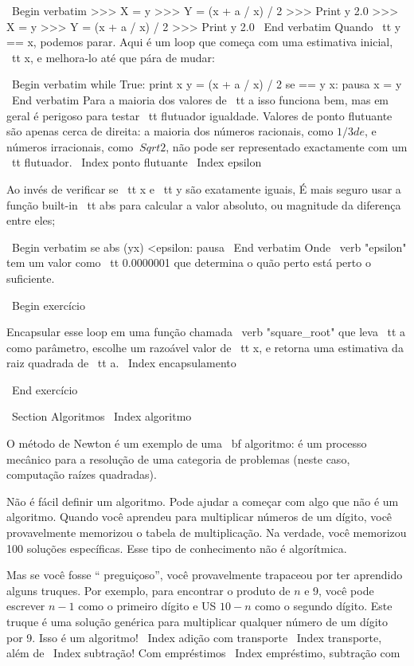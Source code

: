 \documentclass[10pt]{book}
\begin{document}
\begin {itemize}
{{{{\ Begin {verbatim}
>>> X = y
>>> Y = (x + a / x) / 2
>>> Print y
2.0
>>> X = y
>>> Y = (x + a / x) / 2
>>> Print y
2.0
\ End {verbatim}
%
Quando {\ tt y == x}, podemos parar. Aqui é um loop que começa
com uma estimativa inicial, {\ tt x}, e melhora-lo até que
pára de mudar:

\ Begin {verbatim}
while True:
    print x
    y = (x + a / x) / 2
    se == y x:
        pausa
    x = y
\ End {verbatim}
%
Para a maioria dos valores de {\ tt a} isso funciona bem, mas em geral é
perigoso para testar {\ tt flutuador} igualdade.
Valores de ponto flutuante são apenas cerca de direita:
a maioria dos números racionais, como $ 1/3 de $, e números irracionais, como
$ \ Sqrt {2} $, não pode ser representado exactamente com um {\ tt flutuador}.
\ Index {ponto flutuante}
\ Index {epsilon}

Ao invés de verificar se {\ tt x} e {\ tt y} são exatamente iguais,
É mais seguro usar a função built-in {\ tt abs} para calcular a
valor absoluto, ou magnitude da diferença entre eles;

\ Begin {verbatim}
    se abs (yx) <epsilon:
        pausa
\ End {verbatim}
%
Onde \ verb "epsilon" tem um valor como {\ tt 0.0000001} que
determina o quão perto está perto o suficiente.

\ Begin {} exercício

Encapsular esse loop em uma função chamada \ verb "square_root"
que leva {\ tt a} como parâmetro, escolhe um razoável
valor de {\ tt x}, e retorna uma estimativa da raiz quadrada
de {\ tt a}.
\ Index {} encapsulamento

\ End {} exercício


\ Section {} Algoritmos
\ Index {algoritmo}

O método de Newton é um exemplo de uma {\ bf algoritmo}: é um
processo mecânico para a resolução de uma categoria de problemas (neste
caso, computação raízes quadradas).

Não é fácil definir um algoritmo. Pode ajudar a começar
com algo que não é um algoritmo. Quando você aprendeu
para multiplicar números de um dígito, você provavelmente memorizou o
tabela de multiplicação. Na verdade, você memorizou 100 soluções específicas.
Esse tipo de conhecimento não é algorítmica.

Mas se você fosse `` preguiçoso'', você provavelmente trapaceou por ter aprendido alguns
truques. Por exemplo, para encontrar o produto de $ n $ e 9, você pode
escrever $ n-1 $ como o primeiro dígito e US $ 10-n $ como o segundo
dígito. Este truque é uma solução genérica para multiplicar qualquer
número de um dígito por 9. Isso é um algoritmo!
\ Index {adição com transporte}
\ Index {transporte, além de}
\ Index {subtração! Com empréstimos}
\ Index {empréstimo, subtração com}

}}}}
\end{itemize}
\end{document}
